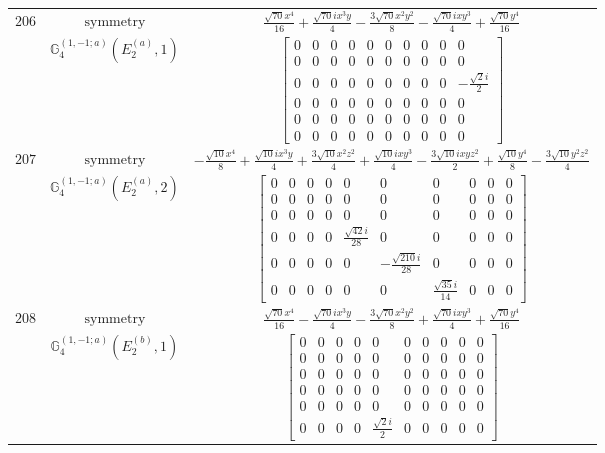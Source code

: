 \documentclass[fleqn,8pt,landscape]{jsarticle}
\begin{document}
\begin{longtable}{ccc}
$ 206 $ & $ \text{symmetry} $ & $ \frac{\sqrt{70} x^{4}}{16} + \frac{\sqrt{70} i x^{3} y}{4} - \frac{3 \sqrt{70} x^{2} y^{2}}{8} - \frac{\sqrt{70} i x y^{3}}{4} + \frac{\sqrt{70} y^{4}}{16} $ \\
$  $ & $ \mathbb{G}_{4}^{(1,-1;a)}(E_{2}^{(a)},1) $ & $ \begin{bmatrix} 0 & 0 & 0 & 0 & 0 & 0 & 0 & 0 & 0 & 0 \\ 0 & 0 & 0 & 0 & 0 & 0 & 0 & 0 & 0 & 0 \\ 0 & 0 & 0 & 0 & 0 & 0 & 0 & 0 & 0 & - \frac{\sqrt{2} i}{2} \\ 0 & 0 & 0 & 0 & 0 & 0 & 0 & 0 & 0 & 0 \\ 0 & 0 & 0 & 0 & 0 & 0 & 0 & 0 & 0 & 0 \\ 0 & 0 & 0 & 0 & 0 & 0 & 0 & 0 & 0 & 0 \end{bmatrix} $ \\ \hline
$ 207 $ & $ \text{symmetry} $ & $ - \frac{\sqrt{10} x^{4}}{8} + \frac{\sqrt{10} i x^{3} y}{4} + \frac{3 \sqrt{10} x^{2} z^{2}}{4} + \frac{\sqrt{10} i x y^{3}}{4} - \frac{3 \sqrt{10} i x y z^{2}}{2} + \frac{\sqrt{10} y^{4}}{8} - \frac{3 \sqrt{10} y^{2} z^{2}}{4} $ \\
$  $ & $ \mathbb{G}_{4}^{(1,-1;a)}(E_{2}^{(a)},2) $ & $ \begin{bmatrix} 0 & 0 & 0 & 0 & 0 & 0 & 0 & 0 & 0 & 0 \\ 0 & 0 & 0 & 0 & 0 & 0 & 0 & 0 & 0 & 0 \\ 0 & 0 & 0 & 0 & 0 & 0 & 0 & 0 & 0 & 0 \\ 0 & 0 & 0 & 0 & \frac{\sqrt{42} i}{28} & 0 & 0 & 0 & 0 & 0 \\ 0 & 0 & 0 & 0 & 0 & - \frac{\sqrt{210} i}{28} & 0 & 0 & 0 & 0 \\ 0 & 0 & 0 & 0 & 0 & 0 & \frac{\sqrt{35} i}{14} & 0 & 0 & 0 \end{bmatrix} $ \\ \hline
$ 208 $ & $ \text{symmetry} $ & $ \frac{\sqrt{70} x^{4}}{16} - \frac{\sqrt{70} i x^{3} y}{4} - \frac{3 \sqrt{70} x^{2} y^{2}}{8} + \frac{\sqrt{70} i x y^{3}}{4} + \frac{\sqrt{70} y^{4}}{16} $ \\
$  $ & $ \mathbb{G}_{4}^{(1,-1;a)}(E_{2}^{(b)},1) $ & $ \begin{bmatrix} 0 & 0 & 0 & 0 & 0 & 0 & 0 & 0 & 0 & 0 \\ 0 & 0 & 0 & 0 & 0 & 0 & 0 & 0 & 0 & 0 \\ 0 & 0 & 0 & 0 & 0 & 0 & 0 & 0 & 0 & 0 \\ 0 & 0 & 0 & 0 & 0 & 0 & 0 & 0 & 0 & 0 \\ 0 & 0 & 0 & 0 & 0 & 0 & 0 & 0 & 0 & 0 \\ 0 & 0 & 0 & 0 & \frac{\sqrt{2} i}{2} & 0 & 0 & 0 & 0 & 0 \end{bmatrix} $ \\ \hline

\end{longtable}
\end{document}
